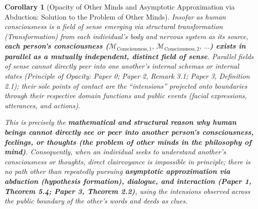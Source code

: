 \documentclass[11pt,a4paper]{article}
\theoremstyle{definition}
\theoremstyle{plain}
\newtheorem{corollary}{Corollary}[section]
\begin{document}
\begin{corollary}[Opacity of Other Minds and Asymptotic Approximation via Abduction: Solution to the Problem of Other Minds]
Insofar as human consciousness is a field of sense emerging via structural transformation (Transformation) from each individual's body and nervous system as its source, \textbf{each person's consciousness ($\mathcal{M}_{\mathrm{Consciousness}, 1},\, \mathcal{M}_{\mathrm{Consciousness}, 2},\, \dots$) exists in parallel as a mutually independent, distinct field of sense}. Parallel fields of sense cannot directly peer into one another's internal schemas or internal states (Principle of Opacity: Paper 0; Paper 2, Remark 3.1; Paper 3, Definition 2.1); their sole points of contact are the ``intensions'' projected onto boundaries through their respective domain functions and public events (facial expressions, utterances, and actions).

This is precisely the \textbf{mathematical and structural reason why human beings cannot directly see or peer into another person's consciousness, feelings, or thoughts (the problem of other minds in the philosophy of mind)}. Consequently, when an individual seeks to understand another's consciousness or thoughts, direct clairvoyance is impossible in principle; there is no path other than repeatedly pursuing \textbf{asymptotic approximation via abduction (hypothesis formation), dialogue, and interaction (Paper 1, Theorem 5.4; Paper 3, Theorem 2.2)}, using the intensions observed across the public boundary of the other's words and deeds as clues.
\end{corollary}
\end{document}
